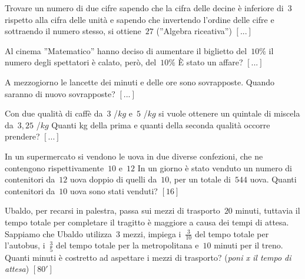 \begin{multicols}{2}
\begin{esercizio}
\label{ese:14.45}
Trovare un numero di due cifre sapendo che la cifra delle decine è inferiore 
di~$3$ rispetto alla cifra delle unità e sapendo che invertendo l'ordine delle 
cifre e sottraendo il numero stesso, si ottiene~$27$ (''Algebra riceativa'')
 \hfill $\left[...\right]$
\end{esercizio}

\begin{esercizio}
\label{ese:14.46}
Al cinema ''Matematico'' hanno deciso di aumentare il biglietto del~$10 \%$ il 
numero degli spettatori è calato, però, del~$10 \%$ È stato un affare?
 \hfill $\left[...\right]$
\end{esercizio}

\begin{esercizio}
\label{ese:14.47}
A mezzogiorno le lancette dei minuti e delle ore sono sovrapposte. Quando 
saranno di nuovo sovrapposte? \hfill $\left[...\right]$
\end{esercizio}

\begin{esercizio}
\label{ese:14.48}
Con due qualità di caffè da~$3$ \officialeuro/$\unit{kg}$ e~$5$ 
\officialeuro/$\unit{kg}$ si vuole ottenere un quintale di miscela da~$3,25$ 
\officialeuro/$\unit{kg}$ Quanti kg della prima e quanti della seconda qualità 
occorre prendere? \hfill $\left[...\right]$
\end{esercizio}

\begin{esercizio}[\Ast]
\label{ese:14.49}
In un supermercato si vendono le uova in due diverse confezioni, che ne 
contengono rispettivamente~$10$ e~$12$ In un giorno è stato venduto un numero 
di 
contenitori da~$12$ uova doppio di quelli da~$10$, per un totale di~$544$ uova. 
Quanti contenitori da~$10$ uova sono stati venduti? \hfill $\left[16\right]$
\end{esercizio}

\begin{esercizio}[\Ast]
\label{ese:14.50}
Ubaldo, per recarsi in palestra, passa sui mezzi di trasporto~$20$ minuti, 
tuttavia il tempo totale per completare il tragitto è maggiore a causa dei 
tempi 
di attesa. Sappiamo che Ubaldo utilizza~$3$ mezzi, impiega i~$\frac{3}{10}$ del 
tempo totale per l'autobus, i~$\frac{3}{5}$ del tempo totale per la 
metropolitana e~$10$ minuti per il treno. Quanti minuti è costretto ad 
aspettare 
i mezzi di trasporto? (\emph{poni x il tempo di attesa})
 \hfill $\left[80'\right]$
\end{esercizio}


\end{multicols}
